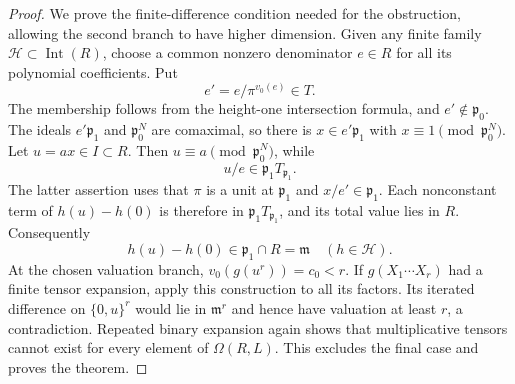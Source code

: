 \begin{proof}
We prove the finite-difference condition needed for the
obstruction, allowing the second branch to have higher dimension.
Given any finite family $\mathcal H\subset\operatorname{Int}(R)$,
choose a common nonzero denominator $e\in R$ for all its
polynomial coefficients. Put
\[
 e'=e/\pi^{v_0(e)}\in T.
\]
The membership follows from the height-one intersection formula,
and $e'\notin\mathfrak p_0$.
The ideals $e'\mathfrak p_1$ and $\mathfrak p_0^N$ are comaximal,
so there is $x\in e'\mathfrak p_1$ with
$x\equiv1\pmod{\mathfrak p_0^N}$. Let $u=ax\in I\subset R$.
Then $u\equiv a\pmod{\mathfrak p_0^N}$, while
\[
 u/e\in\mathfrak p_1T_{\mathfrak p_1}.
\]
The latter assertion uses that $\pi$ is a unit at
$\mathfrak p_1$ and $x/e'\in\mathfrak p_1$.
Each nonconstant term of $h(u)-h(0)$ is therefore in
$\mathfrak p_1T_{\mathfrak p_1}$, and its total value lies in
$R$. Consequently
\[
 h(u)-h(0)\in\mathfrak p_1\cap R=\mathfrak m
        \quad(h\in\mathcal H).
\]
At the chosen valuation branch,
$v_0(g(u^r))=c_0<r$.
If $g(X_1\cdots X_r)$ had a finite tensor expansion, apply this
construction to all its factors. Its iterated difference on
$\{0,u\}^r$ would lie in $\mathfrak m^r$ and hence have
valuation at least $r$, a contradiction. Repeated binary
expansion again shows that multiplicative tensors cannot exist
for every element of $\Omega(R,L)$.
This excludes the final case and proves the theorem.
\end{proof}

